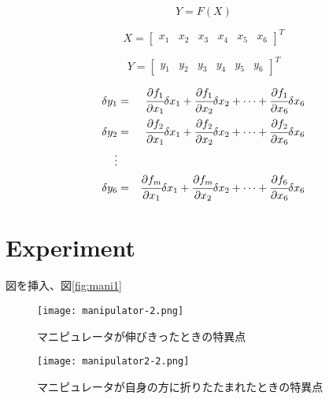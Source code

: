 \documentclass [titlepage, a4j, 11pt] {jsarticle}
\begin{document}
\begin{equation}
Y=F(X)
\end{equation}

\begin{equation}
X=
	\begin{bmatrix}
	x_1 &x_2 &x_3 &x_4 &x_5 &x_6
	\end{bmatrix}
^T
\end{equation}

\begin{equation}
Y=
	\begin{bmatrix}
	y_1 &y_2 &y_3 &y_4 &y_5 &y_6
	\end{bmatrix}
^T
\end{equation}

\begin{eqnarray}
\delta y_1&=&\cfrac{\partial f_1}{\partial x_1}\delta x_1+\cfrac{\partial f_1}{\partial x_2}\delta x_2+\cdots+
				\cfrac{\partial f_1}{\partial x_6}\delta x_6 \nonumber \\
\delta y_2&=&\cfrac{\partial f_2}{\partial x_1}\delta x_1+\cfrac{\partial f_2}{\partial x_2}\delta x_2+\cdots+
				\cfrac{\partial f_2}{\partial x_6}\delta x_6 \nonumber \\
\vdots \\
\delta y_6&=&\cfrac{\partial f_m}{\partial x_1}\delta x_1+\cfrac{\partial f_m}{\partial x_2}\delta x_2+\cdots+
				\cfrac{\partial f_6}{\partial x_6}\delta x_6 \nonumber
\end{eqnarray}

\newpage
\section{Experiment}
図を挿入、図\ref{fig:mani1}
\begin{figure}[H]
\begin{minipage}{0.5 \hsize}
	\begin{center}
		\texttt{[image: manipulator-2.png]} %
		\caption{マニピュレータが伸びきったときの特異点}
		\label{fig:mani1}
	\end{center}
\end{minipage}
\begin{minipage}{0.5 \hsize}
	\begin{center}
		\texttt{[image: manipulator2-2.png]} %
		\caption{マニピュレータが自身の方に折りたたまれたときの特異点}
		\label{fig:mani2}
	\end{center}
\end{minipage}
\end{figure}
\end{document}

